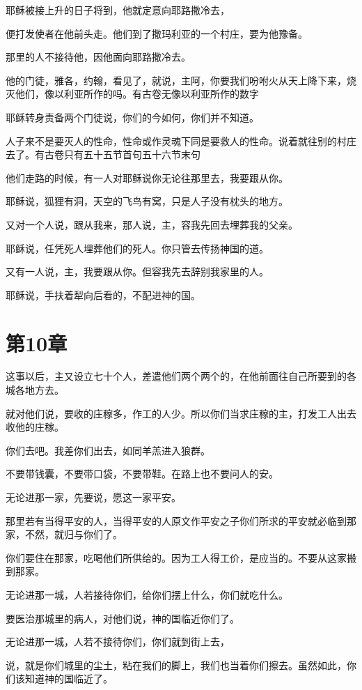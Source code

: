 \documentclass[12pt,oneside]{book}
\begin{document}
耶稣被接上升的日子将到，他就定意向耶路撒冷去，

便打发使者在他前头走。他们到了撒玛利亚的一个村庄，要为他豫备。

那里的人不接待他，因他面向耶路撒冷去。

他的门徒，雅各，约翰，看见了，就说，主阿，你要我们吩咐火从天上降下来，烧灭他们，像以利亚所作的吗。有古卷无像以利亚所作的数字

耶稣转身责备两个门徒说，你们的今如何，你们并不知道。

人子来不是要灭人的性命，性命或作灵魂下同是要救人的性命。说着就往别的村庄去了。有古卷只有五十五节首句五十六节末句

他们走路的时候，有一人对耶稣说你无论往那里去，我要跟从你。

耶稣说，狐狸有洞，天空的飞鸟有窝，只是人子没有枕头的地方。

又对一个人说，跟从我来，那人说，主，容我先回去埋葬我的父亲。

耶稣说，任凭死人埋葬他们的死人。你只管去传扬神国的道。

又有一人说，主，我要跟从你。但容我先去辞别我家里的人。

耶稣说，手扶着犁向后看的，不配进神的国。

\chapter{第10章}
这事以后，主又设立七十个人，差遣他们两个两个的，在他前面往自己所要到的各城各地方去。

就对他们说，要收的庄稼多，作工的人少。所以你们当求庄稼的主，打发工人出去收他的庄稼。

你们去吧。我差你们出去，如同羊羔进入狼群。

不要带钱囊，不要带口袋，不要带鞋。在路上也不要问人的安。

无论进那一家，先要说，愿这一家平安。

那里若有当得平安的人，当得平安的人原文作平安之子你们所求的平安就必临到那家，不然，就归与你们了。

你们要住在那家，吃喝他们所供给的。因为工人得工价，是应当的。不要从这家搬到那家。

无论进那一城，人若接待你们，给你们摆上什么，你们就吃什么。

要医治那城里的病人，对他们说，神的国临近你们了。

无论进那一城，人若不接待你们，你们就到街上去，

说，就是你们城里的尘土，粘在我们的脚上，我们也当着你们擦去。虽然如此，你们该知道神的国临近了。
\end{document}
